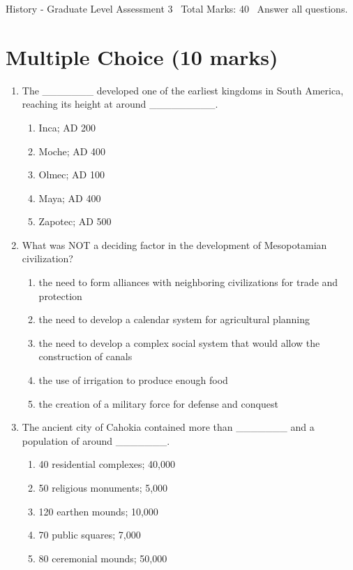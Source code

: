 \documentclass[12pt]{article}
\begin{document}
\begin{center}
History - Graduate Level Assessment 3 \
Total Marks: 40 \
Answer all questions.
\end{center}

\section*{Multiple Choice (10 marks)}
\begin{enumerate}[label=\arabic*.]
\item The \_\_\_\_\_\_\_ developed one of the earliest kingdoms in South America, reaching its height at around \_\_\_\_\_\_\_\_\_.
\begin{enumerate}[label=(\alph*)]
    \item Inca; AD 200
    \item Moche; AD 400
    \item Olmec; AD 100
    \item Maya; AD 400
    \item Zapotec; AD 500
\end{enumerate}
\item What was NOT a deciding factor in the development of Mesopotamian civilization?
\begin{enumerate}[label=(\alph*)]
    \item the need to form alliances with neighboring civilizations for trade and protection
    \item the need to develop a calendar system for agricultural planning
    \item the need to develop a complex social system that would allow the construction of canals
    \item the use of irrigation to produce enough food
    \item the creation of a military force for defense and conquest
\end{enumerate}
\item The ancient city of Cahokia contained more than \_\_\_\_\_\_\_ and a population of around \_\_\_\_\_\_\_.
\begin{enumerate}[label=(\alph*)]
    \item 40 residential complexes; 40,000
    \item 50 religious monuments; 5,000
    \item 120 earthen mounds; 10,000
    \item 70 public squares; 7,000
    \item 80 ceremonial mounds; 50,000
\end{enumerate}

\end{enumerate}
\end{document}
